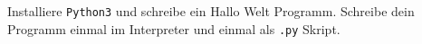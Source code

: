 \begin{aufg}
 Installiere \texttt{Python3} und schreibe ein Hallo Welt Programm.
 Schreibe dein Programm einmal im Interpreter und einmal als
 \texttt{.py} Skript.
\end{aufg}
